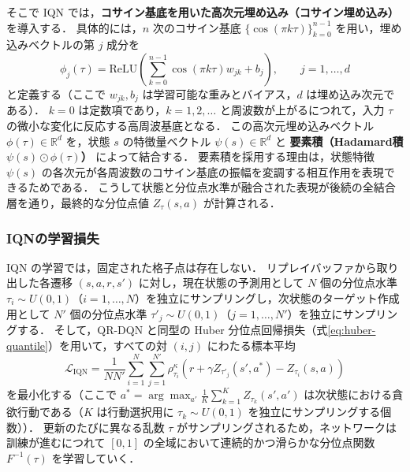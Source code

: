 \documentclass[a4paper,10pt]{jsarticle}
\theoremstyle{definition}
\renewcommand{\Finv}{F^{-1}}
\newcommand{\R}{\mathbb{R}}
\begin{document}
そこで IQN では，\textbf{コサイン基底を用いた高次元埋め込み（コサイン埋め込み）} を導入する．
具体的には，$n$ 次のコサイン基底 $\{\cos(\pi k \tau)\}_{k=0}^{n-1}$ を用い，埋め込みベクトルの第 $j$ 成分を
\begin{equation}
  \phi_j(\tau) = \mathrm{ReLU}\!\left(\sum_{k=0}^{n-1}\cos(\pi k\tau)w_{jk} + b_j\right),\qquad j=1,\dots,d
  \label{eq:cosine-emb}
\end{equation}
と定義する（ここで $w_{jk}, b_j$ は学習可能な重みとバイアス，$d$ は埋め込み次元である）．
$k=0$ は定数項であり，$k=1, 2, \dots$ と周波数が上がるにつれて，入力 $\tau$ の微小な変化に反応する高周波基底となる．
この高次元埋め込みベクトル $\phi(\tau) \in \R^d$ を，状態 $s$ の特徴量ベクトル $\psi(s) \in \R^d$ と \textbf{要素積（Hadamard積 $\psi(s) \odot \phi(\tau)$）} によって結合する．
要素積を採用する理由は，状態特徴 $\psi(s)$ の各次元が各周波数のコサイン基底の振幅を変調する相互作用を表現できるためである．
こうして状態と分位点水準が融合された表現が後続の全結合層を通り，最終的な分位点値 $Z_\tau(s, a)$ が計算される．

\subsubsection{IQNの学習損失}
IQN の学習では，固定された格子点は存在しない．
リプレイバッファから取り出した各遷移 $(s, a, r, s')$ に対し，現在状態の予測用として $N$ 個の分位点水準 $\tau_i \sim U(0, 1)$（$i=1,\dots,N$）を独立にサンプリングし，次状態のターゲット作成用として $N'$ 個の分位点水準 $\tau'_j \sim U(0, 1)$（$j=1,\dots,N'$）を独立にサンプリングする．
そして，QR-DQN と同型の Huber 分位点回帰損失（式\eqref{eq:huber-quantile}）を用いて，すべての対 $(i, j)$ にわたる標本平均
\begin{equation}
  \mathcal{L}_{\mathrm{IQN}} = \frac{1}{N N'}\sum_{i=1}^N\sum_{j=1}^{N'}\rho^\kappa_{\tau_i}\!\left(r + \gamma Z_{\tau'_j}(s', a^*) - Z_{\tau_i}(s, a)\right)
  \label{eq:iqn-loss}
\end{equation}
を最小化する（ここで $a^* = \arg\max_{a'} \frac{1}{K}\sum_{k=1}^K Z_{\tau_k}(s', a')$ は次状態における貪欲行動である（$K$ は行動選択用に $\tau_k\sim U(0,1)$ を独立にサンプリングする個数））．
更新のたびに異なる乱数 $\tau$ がサンプリングされるため，ネットワークは訓練が進むにつれて $[0, 1]$ の全域において連続的かつ滑らかな分位点関数 $\Finv(\tau)$ を学習していく．
\end{document}
